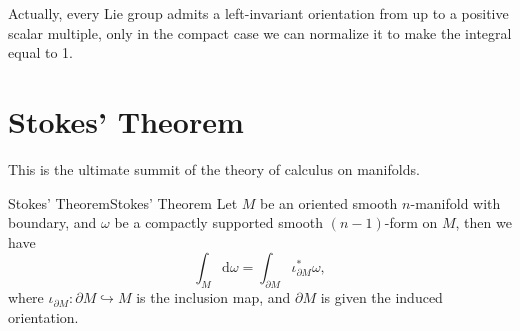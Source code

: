\documentclass[../main.tex]{subfiles}
\begin{document}
\begin{remark}
  Actually, every Lie group admits a left-invariant orientation from up to a positive scalar multiple, only in the compact case we can normalize it to make the integral equal to 1.
\end{remark}

\section{Stokes' Theorem}
This is the ultimate summit of the theory of calculus on manifolds.

\begin{theorem}{Stokes' Theorem}{Stokes' Theorem}
  Let $M$ be an oriented smooth $n$-manifold with boundary, and $\omega$ be a compactly supported smooth $(n-1)$-form on $M$, then we have
  \begin{equation}
    \int_M \mathrm{d} \omega = \int_{\partial M} \iota^*_{\partial M} \omega,
  \end{equation}
  where $\iota_{\partial M}: \partial M \hookrightarrow M$ is the inclusion map, and $\partial M$ is given the induced orientation.
\end{theorem}
\end{document}
